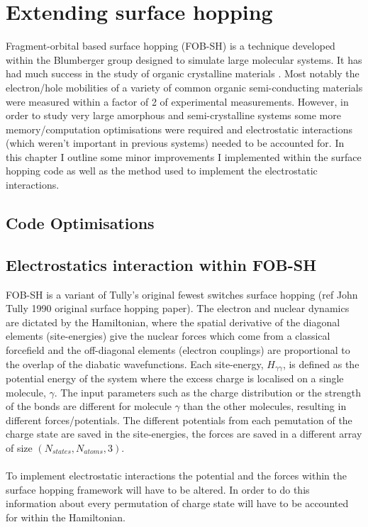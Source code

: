 \chapter{Extending surface hopping}
\label{chap:surface_hopping_ext}
Fragment-orbital based surface hopping (FOB-SH) is a technique developed within the Blumberger group \cite{spencer_fob-sh:_2016} designed to simulate large molecular systems. It has had much success in the study of organic crystalline materials \cite{giannini_crossover_2018, carof_detailed_2017}. Most notably the electron/hole mobilities of a variety of common organic semi-conducting materials were measured within a factor of 2 of experimental measurements. However, in order to study very large amorphous and semi-crystalline systems some more memory/computation optimisations were required and electrostatic interactions (which weren't important in previous systems) needed to be accounted for. In this chapter I outline some minor improvements I implemented within the surface hopping code as well as the method used to implement the electrostatic interactions.

\section{Code Optimisations}

\section{Electrostatics interaction within FOB-SH}
FOB-SH is a variant of Tully's original fewest switches surface hopping \cite{} (ref John Tully 1990 original surface hopping paper). The electron and nuclear dynamics are dictated by the Hamiltonian, where the spatial derivative of the diagonal elements (site-energies) give the nuclear forces which come from a classical forcefield and the off-diagonal elements (electron couplings) are proportional to the overlap of the diabatic wavefunctions. Each site-energy, $H_{\gamma \gamma}$, is defined as the potential energy of the system where the excess charge is localised on a single molecule, $\gamma$. The input parameters such as the charge distribution or the strength of the bonds are different for molecule $\gamma$ than the other molecules, resulting in different forces/potentials. The different potentials from each pemutation of the charge state are saved in the site-energies, the forces are saved in a different array of size $(N_{states}, N_{atoms}, 3)$.
\\\\
To implement electrostatic interactions the potential and the forces within the surface hopping framework will have to be altered. In order to do this information about every permutation of charge state will have to be accounted for within the Hamiltonian. 
